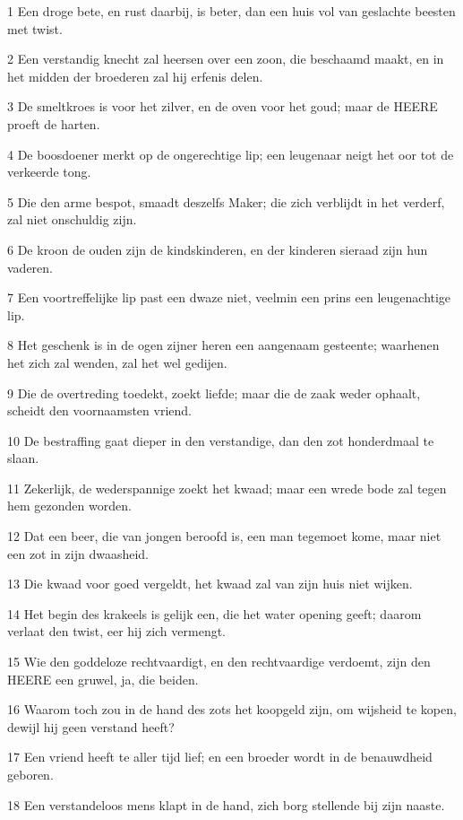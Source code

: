 \par 1 Een droge bete, en rust daarbij, is beter, dan een huis vol van geslachte beesten met twist.
\par 2 Een verstandig knecht zal heersen over een zoon, die beschaamd maakt, en in het midden der broederen zal hij erfenis delen.
\par 3 De smeltkroes is voor het zilver, en de oven voor het goud; maar de HEERE proeft de harten.
\par 4 De boosdoener merkt op de ongerechtige lip; een leugenaar neigt het oor tot de verkeerde tong.
\par 5 Die den arme bespot, smaadt deszelfs Maker; die zich verblijdt in het verderf, zal niet onschuldig zijn.
\par 6 De kroon de ouden zijn de kindskinderen, en der kinderen sieraad zijn hun vaderen.
\par 7 Een voortreffelijke lip past een dwaze niet, veelmin een prins een leugenachtige lip.
\par 8 Het geschenk is in de ogen zijner heren een aangenaam gesteente; waarhenen het zich zal wenden, zal het wel gedijen.
\par 9 Die de overtreding toedekt, zoekt liefde; maar die de zaak weder ophaalt, scheidt den voornaamsten vriend.
\par 10 De bestraffing gaat dieper in den verstandige, dan den zot honderdmaal te slaan.
\par 11 Zekerlijk, de wederspannige zoekt het kwaad; maar een wrede bode zal tegen hem gezonden worden.
\par 12 Dat een beer, die van jongen beroofd is, een man tegemoet kome, maar niet een zot in zijn dwaasheid.
\par 13 Die kwaad voor goed vergeldt, het kwaad zal van zijn huis niet wijken.
\par 14 Het begin des krakeels is gelijk een, die het water opening geeft; daarom verlaat den twist, eer hij zich vermengt.
\par 15 Wie den goddeloze rechtvaardigt, en den rechtvaardige verdoemt, zijn den HEERE een gruwel, ja, die beiden.
\par 16 Waarom toch zou in de hand des zots het koopgeld zijn, om wijsheid te kopen, dewijl hij geen verstand heeft?
\par 17 Een vriend heeft te aller tijd lief; en een broeder wordt in de benauwdheid geboren.
\par 18 Een verstandeloos mens klapt in de hand, zich borg stellende bij zijn naaste.
